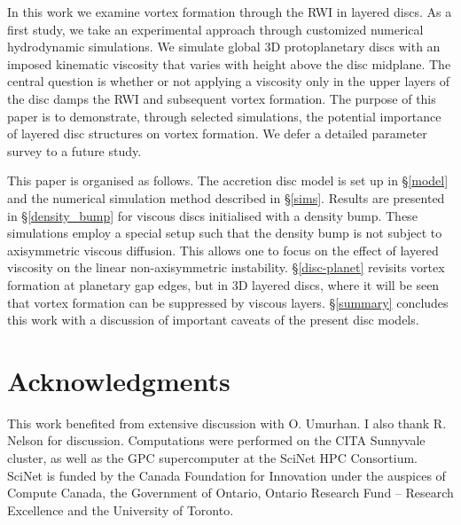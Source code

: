 \documentclass[useAMS,usenatbib]{mn2e}
\begin{document}
In this work we examine vortex formation through the RWI in
layered discs. As a first study, we take an
experimental approach through customized numerical hydrodynamic
simulations. We simulate global 3D protoplanetary discs with an imposed
kinematic viscosity that varies with height above the disc
midplane. %
The central question is whether or not applying a viscosity only in the upper
layers of the disc damps the RWI and subsequent vortex formation.   
The purpose of this paper is to demonstrate, through selected 
simulations, the potential importance of layered disc structures on
vortex formation. We defer a detailed parameter survey to a future
study.  

 
This paper is organised as follows. The accretion disc model is 
set up in \S\ref{model} and the numerical simulation method described
in \S\ref{sims}. Results are presented in \S\ref{density_bump} for 
viscous discs initialised with a density bump. These 
simulations employ a special setup such that the density bump is not
subject to axisymmetric viscous diffusion. This allows one to
focus on the effect of layered viscosity on the linear
non-axisymmetric instability. \S\ref{disc-planet} revisits vortex
formation at planetary gap edges, but in 3D layered discs, 
where it will be seen that vortex formation can be suppressed by
viscous layers. \S\ref{summary} concludes this work with a discussion
of important caveats of the present disc models.   







\section*{Acknowledgments}
This work benefited from extensive discussion with O. Umurhan. I also
thank R. Nelson for discussion. Computations were performed on the
CITA Sunnyvale cluster, as well as the GPC supercomputer at the SciNet
HPC Consortium. SciNet is funded by the Canada Foundation for
Innovation under the auspices of Compute Canada, the Government of
Ontario, Ontario Research Fund – Research Excellence and the
University of Toronto.   




\appendix

%
\end{document}
